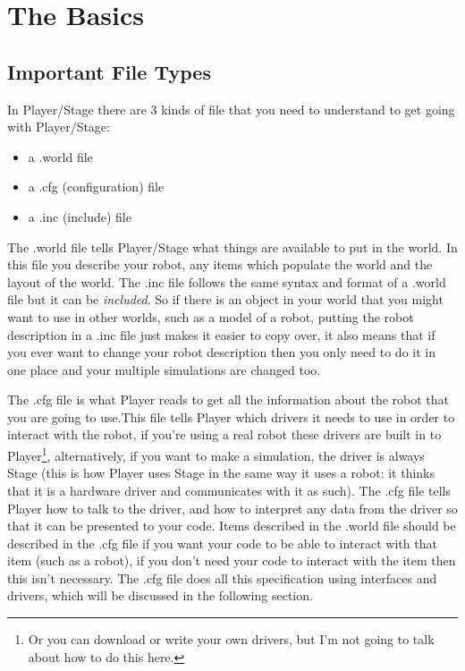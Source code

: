 \documentclass[a4paper]{report}
\newcommand{\plst}{Player/Stage\xspace}
\newcommand{\pl}{Player\xspace}
\begin{document}
\chapter{The Basics}

\section{Important File Types}
In \plst there are 3 kinds of file that you need to understand to get going with \plst:
\begin{itemize}
	\item a .world file
	\item a .cfg (configuration) file
	\item a .inc (include) file
\end{itemize}
The .world file tells \plst what things are available to put in the world. In this file you describe your robot, any items which populate the world and the layout of the world. The .inc file follows the same syntax and format of a .world file but it can be \emph{included}. So if there is an object in your world that you might want to use in other worlds, such as a model of a robot, putting the robot description in a .inc file just makes it easier to copy over, it also means that if you ever want to change your robot description then you only need to do it in one place and your multiple simulations are changed too.

The .cfg file is what \pl reads to get all the information about the robot that you are going to use.This file tells \pl which drivers it needs to use in order to interact with the robot, if you're using a real robot these drivers are built in to \pl\footnote{Or you can download or write your own drivers, but I'm not going to talk about how to do this here.}, alternatively, if you want to make a simulation, the driver is always Stage (this is how \pl uses Stage in the same way it uses a robot: it thinks that it is a hardware driver and communicates with it as such). The .cfg file tells \pl how to talk to the driver, and how to interpret any data from the driver so that it can be presented to your code. Items described in the .world file should be described in the .cfg file if you want your code to be able to interact with that item (such as a robot), if you don't need your code to interact with the item then this isn't necessary. The .cfg file does all this specification using interfaces and drivers, which will be discussed in the following section.
\end{document}

